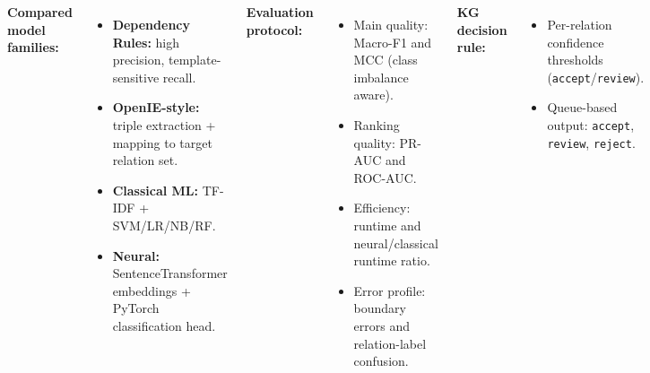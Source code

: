 \documentclass[20pt, a0paper, portrait]{tikzposter} %
\begin{document}
\begin{columns}
{    \vspace{0.2cm}
    \textbf{Compared model families:}
    \begin{itemize}[leftmargin=*, noitemsep]
        \item \textbf{Dependency Rules:} high precision, template-sensitive recall.
        \item \textbf{OpenIE-style:} triple extraction + mapping to target relation set.
        \item \textbf{Classical ML:} TF-IDF + SVM/LR/NB/RF.
        \item \textbf{Neural:} SentenceTransformer embeddings + PyTorch classification head.
    \end{itemize}

    \vspace{0.2cm}
    \textbf{Evaluation protocol:}
    \begin{itemize}[leftmargin=*, noitemsep]
        \item Main quality: Macro-F1 and MCC (class imbalance aware).
        \item Ranking quality: PR-AUC and ROC-AUC.
        \item Efficiency: runtime and neural/classical runtime ratio.
        \item Error profile: boundary errors and relation-label confusion.
    \end{itemize}

    \vspace{0.2cm}
    \textbf{KG decision rule:}
    \begin{itemize}[leftmargin=*, noitemsep]
        \item Per-relation confidence thresholds (\texttt{accept}/\texttt{review}).
        \item Queue-based output: \texttt{accept}, \texttt{review}, \texttt{reject}.
    \end{itemize}
}

\end{columns}
\end{document}
